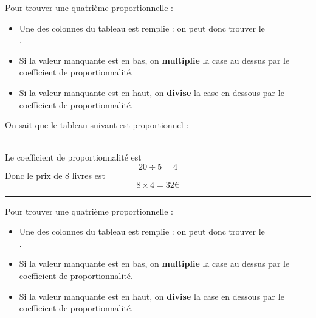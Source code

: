 \documentclass[a4paper,11pt]{article}
\begin{document}
\begin{methode}
	Pour trouver une quatrième proportionnelle :
	\begin{itemize}
		\item Une des colonnes du tableau est remplie : on peut donc trouver le \\ .
		\item Si la valeur manquante est en bas, on \textbf{multiplie} la case au dessus par le coefficient de proportionnalité.
		\item Si la valeur manquante est en haut, on \textbf{divise} la case en dessous par le coefficient de proportionnalité.
	\end{itemize}
\end{methode}

\begin{exemple}
	On sait que le tableau suivant est proportionnel :

	  \\
	Le coefficient de proportionnalité est
	$$ 20 ÷ 5 = 4 $$
	Donc le prix de 8 livres est
	$$ 8 × 4 = 32€ $$
\end{exemple}

\vspace{3em}
\hrule
\vspace{2em}

\begin{methode}
	Pour trouver une quatrième proportionnelle :
	\begin{itemize}
		\item Une des colonnes du tableau est remplie : on peut donc trouver le \\ .
		\item Si la valeur manquante est en bas, on \textbf{multiplie} la case au dessus par le coefficient de proportionnalité.
		\item Si la valeur manquante est en haut, on \textbf{divise} la case en dessous par le coefficient de proportionnalité.
	\end{itemize}
\end{methode}
\end{document}
